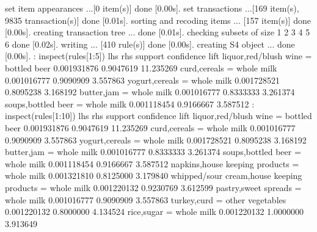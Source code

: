 \documentclass[a4paper,12pt]{article}
\begin{document}
set item appearances ...[0 item(s)] done [0.00s].
\newline
set transactions ...[169 item(s), 9835 transaction(s)] done [0.01s].
\newline
sorting and recoding items ... [157 item(s)] done [0.00s].
\newline
creating transaction tree ... done [0.01s].
\newline
checking subsets of size 1 2 3 4 5 6 done [0.02s].
\newline
writing ... [410 rule(s)] done [0.00s].
\newline
creating S4 object  ... done [0.00s].
\newline
: inspect(rules[1:5])
\newline
lhs                        rhs            support     confidence lift     
 {liquor,red/blush wine} = {bottled beer} 0.001931876 0.9047619  11.235269
 {curd,cereals}          = {whole milk}   0.001016777 0.9090909   3.557863
 {yogurt,cereals}        = {whole milk}   0.001728521 0.8095238   3.168192
 {butter,jam}            = {whole milk}   0.001016777 0.8333333   3.261374
 {soups,bottled beer}    = {whole milk}   0.001118454 0.9166667   3.587512
\newline
: inspect(rules[1:10])
\newline
lhs                                            rhs                support     confidence lift     
  {liquor,red/blush wine}                     = {bottled beer}     0.001931876 0.9047619  11.235269
  {curd,cereals}                              = {whole milk}       0.001016777 0.9090909   3.557863
  {yogurt,cereals}                            = {whole milk}       0.001728521 0.8095238   3.168192
  {butter,jam}                                = {whole milk}       0.001016777 0.8333333   3.261374
  {soups,bottled beer}                        = {whole milk}       0.001118454 0.9166667   3.587512
  {napkins,house keeping products}            = {whole milk}       0.001321810 0.8125000   3.179840
  {whipped/sour cream,house keeping products} = {whole milk}       0.001220132 0.9230769   3.612599
  {pastry,sweet spreads}                      = {whole milk}       0.001016777 0.9090909   3.557863
  {turkey,curd}                               = {other vegetables} 0.001220132 0.8000000   4.134524
 {rice,sugar}                                = {whole milk}       0.001220132 1.0000000   3.913649
\end{document}
